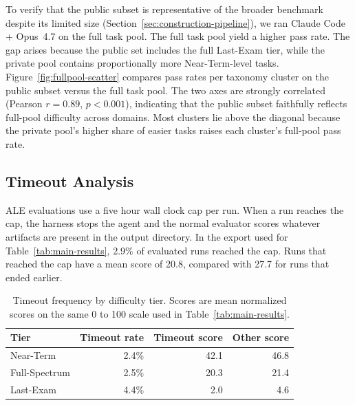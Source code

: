 \documentclass{llmxive}
\begin{document}
To verify that the public subset is representative of the broader benchmark despite its limited size (Section~\ref{sec:construction-pipeline}), we ran Claude Code + Opus~4.7 on the full task pool.
The full task pool yield a higher pass rate.
The gap arises because the public set includes the full Last-Exam tier, while the private pool contains proportionally more Near-Term-level tasks.
Figure~\ref{fig:fullpool-scatter} compares pass rates per taxonomy cluster on the public subset versus the full task pool.
The two axes are strongly correlated (Pearson $r{=}0.89$, $p{<}0.001$), indicating that the public subset faithfully reflects full-pool difficulty across domains.
Most clusters lie above the diagonal because the private pool's higher share of easier tasks raises each cluster's full-pool pass rate.

\subsection{Timeout Analysis}
\label{app:timeout-analysis}

ALE evaluations use a five hour wall clock cap per run.
When a run reaches the cap, the harness stops the agent and the normal evaluator scores whatever artifacts are present in the output directory.
In the export used for Table~\ref{tab:main-results}, 2.9\% of evaluated runs reached the cap.
Runs that reached the cap have a mean score of 20.8, compared with 27.7 for runs that ended earlier.

\begin{table}[!htbp]
\centering
\begin{tabular}{lrrr}
\toprule
Tier & Timeout rate & Timeout score & Other score \\
\midrule
Near-Term & 2.4\% & 42.1 & 46.8 \\
Full-Spectrum & 2.5\% & 20.3 & 21.4 \\
Last-Exam & 4.4\% & 2.0 & 4.6 \\
\bottomrule
\end{tabular}
\caption{Timeout frequency by difficulty tier. Scores are mean normalized scores on the same 0 to 100 scale used in Table~\ref{tab:main-results}.}
\label{tab:timeout-by-tier}
\end{table}
\end{document}
